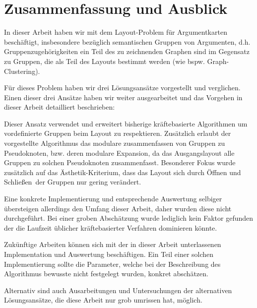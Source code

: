 \chapter{Zusammenfassung und Ausblick}
In dieser Arbeit haben wir mit dem Layout-Problem für Argumentkarten beschäftigt, insbesondere bezüglich semantischen Gruppen von Argumenten, d.h. Gruppenzugehörigkeiten ein Teil des zu zeichnenden Graphen sind im Gegensatz zu Gruppen, die als Teil des Layouts bestimmt werden (wie bspw. Graph-Clustering).

Für dieses Problem haben wir drei Lösungsansätze vorgestellt und verglichen. Einen dieser drei Ansätze haben wir weiter ausgearbeitet und das Vorgehen in dieser Arbeit detailliert beschrieben:

Dieser Ansatz verwendet und erweitert bisherige kräftebasierte Algorithmen um vordefinierte Gruppen beim Layout zu respektieren. Zusätzlich erlaubt der vorgestellte Algorithmus das modulare zusammenfassen von Gruppen zu Pseudoknoten, bzw. deren modulare Expansion, da das Ausgangslayout alle Gruppen zu solchen Pseudoknoten zusammenfasst. Besonderer Fokus wurde zusätzlich auf das Ästhetik-Kriterium, dass das Layout sich durch \glqq Öffnen und Schließen\grqq\  der Gruppen nur gering verändert.

Eine konkrete Implementierung und entsprechende Auswertung selbiger übersteigen allerdings den Umfang dieser Arbeit, daher wurden diese nicht durchgeführt. Bei einer groben Abschätzung wurde lediglich kein Faktor gefunden der die Laufzeit üblicher kräftebasierter Verfahren dominieren könnte.

Zukünftige Arbeiten können sich mit der in dieser Arbeit unterlassenen Implementation und Auswertung beschäftigen. Ein Teil einer solchen Implementierung sollte die Parameter, welche bei der Beschreibung des Algorithmus bewusste nicht festgelegt wurden, konkret abschätzen.

Alternativ sind auch Ausarbeitungen und Untersuchungen der alternativen Lösungsansätze, die diese Arbeit nur grob umrissen hat, möglich.

